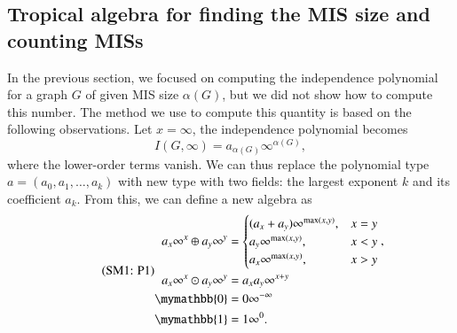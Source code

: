 \documentclass[onefignum, onetabnum]{siamart190516}
\newcommand{\eqname}[1]{\stepcounter{equation}\tag{\theequation : #1}}
\newcommand{\<}{\langle}
\renewcommand{\>}{\rangle}
\begin{document}
\subsection{Tropical algebra for finding the MIS size and counting MISs}
In the previous section, we focused on computing the independence polynomial for a graph $G$ of given MIS size $\alpha(G)$, but we did not show how to compute this number.
The method we use to compute this quantity is based on the following observations. Let $x=\infty$, the independence polynomial becomes
\begin{equation}
I(G, \infty) = a_{\alpha(G)} \infty^{\alpha(G)},
\end{equation}
where the lower-order terms vanish. We can thus replace the polynomial type $a = (a_0, a_1, \ldots, a_k)$ with new type with two fields: the largest exponent $k$ and its coefficient $a_k$.
From this, we can define a new algebra as
\begin{equation}
    \eqname{P1}
\begin{split}
    a_x\infty^x \oplus a_y\infty^y &= \begin{cases}
        (a_x + a_y)\infty^{\max(x,y)}, & x = y\\
        a_y\infty^{\max(x,y)}, & x < y\\
        a_x\infty^{\max(x,y)}, & x > y
    \end{cases}, \\
    a_x\infty^x \odot a_y\infty^y &= a_x a_y\infty^{x+y}\\
    \mymathbb{0} &= 0\infty^{-\infty}\\
    \mymathbb{1} &= 1\infty^{0}.
\end{split}%
\label{eq:countingtropical}
\end{equation}
\end{document}

